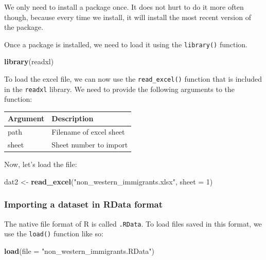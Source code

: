 \documentclass[]{article}
\newenvironment{Shaded}{\begin{snugshade}}{\end{snugshade}}
\newcommand{\DataTypeTok}[1]{\textcolor[rgb]{0.13,0.29,0.53}{#1}}
\newcommand{\DecValTok}[1]{\textcolor[rgb]{0.00,0.00,0.81}{#1}}
\newcommand{\KeywordTok}[1]{\textcolor[rgb]{0.13,0.29,0.53}{\textbf{#1}}}
\newcommand{\NormalTok}[1]{#1}
\newcommand{\StringTok}[1]{\textcolor[rgb]{0.31,0.60,0.02}{#1}}
\begin{document}
We only need to install a package once. It does not hurt to do it more often though, because every time we install, it will install the most recent version of the package.

Once a package is installed, we need to load it using the \texttt{library()} function.

\begin{Shaded}
\begin{Highlighting}[]
\KeywordTok{library}\NormalTok{(readxl)}
\end{Highlighting}
\end{Shaded}

To load the excel file, we can now use the \texttt{read\_excel()} function that is included in the \texttt{readxl} library. We need to provide the following arguments to the function:

\begin{longtable}[]{@{}ll@{}}
\toprule
Argument & Description\tabularnewline
\midrule
\endhead
path & Filename of excel sheet\tabularnewline
sheet & Sheet number to import\tabularnewline
\bottomrule
\end{longtable}

Now, let's load the file:

\begin{Shaded}
\begin{Highlighting}[]
\NormalTok{dat2 <-}\StringTok{ }\KeywordTok{read_excel}\NormalTok{(}\StringTok{"non_western_immigrants.xlsx"}\NormalTok{, }\DataTypeTok{sheet =} \DecValTok{1}\NormalTok{)}
\end{Highlighting}
\end{Shaded}

\hypertarget{importing-a-dataset-in-rdata-format}{%
\subsubsection{Importing a dataset in RData format}\label{importing-a-dataset-in-rdata-format}}

The native file format of R is called \texttt{.RData}. To load files saved in this format, we use the \texttt{load()} function like so:

\begin{Shaded}
\begin{Highlighting}[]
\KeywordTok{load}\NormalTok{(}\DataTypeTok{file =} \StringTok{"non_western_immigrants.RData"}\NormalTok{)}
\end{Highlighting}
\end{Shaded}
\end{document}
